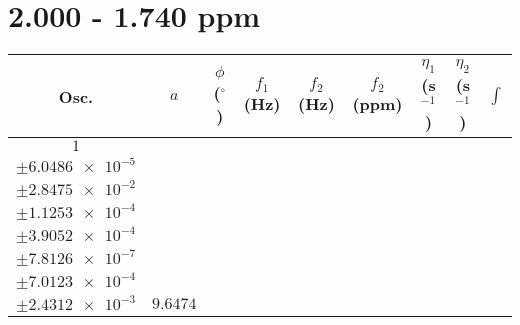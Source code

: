 \documentclass[8pt]{article}
\begin{document}
\section*{2.000 - 1.740 ppm}
\begin{longtable}[l]{c c c c c c c c c}
\toprule
Osc. & $a$ & $\phi$ ($^{\circ}$) & $f_1$ (Hz) & $f_2$ (Hz) & $f_2$ (ppm) & $\eta_1$ (s$^{-1}$) & $\eta_2$ (s$^{-1}$) & $\int$\\
\midrule
$\num{1}$ & \begin{tabular}[c]{@{}c@{}}$\num{0.12297}$ \\ $\pm\num{6.0486e-5}$\end{tabular} & \begin{tabular}[c]{@{}c@{}}$\num{-0.32818}$ \\ $\pm\num{2.8475e-2}$\end{tabular} & \begin{tabular}[c]{@{}c@{}}$\num{-6.6489}$ \\ $\pm\num{1.1253e-4}$\end{tabular} & \begin{tabular}[c]{@{}c@{}}$\num{938.09}$ \\ $\pm\num{3.9052e-4}$\end{tabular} & \begin{tabular}[c]{@{}c@{}}$\num{1.8767}$ \\ $\pm\num{7.8126e-7}$\end{tabular} & \begin{tabular}[c]{@{}c@{}}$\num{1.1767}$ \\ $\pm\num{7.0123e-4}$\end{tabular} & \begin{tabular}[c]{@{}c@{}}$\num{4.2773}$ \\ $\pm\num{2.4312e-3}$\end{tabular} & $\num{9.6474}$\\

\end{longtable}
\end{document}
